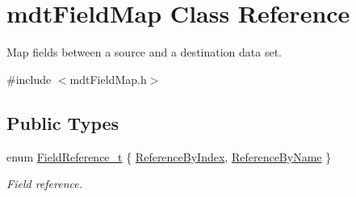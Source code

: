 \hypertarget{classmdt_field_map}{\section{mdt\-Field\-Map Class Reference}
\label{classmdt_field_map}
}


Map fields between a source and a destination data set.  




{\ttfamily \#include $<$mdt\-Field\-Map.\-h$>$}

\subsection*{Public Types}
\begin{DoxyCompactItemize}
\item 
enum \hyperlink{classmdt_field_map_a8a8dd62273d396d926bf3df837407392}{Field\-Reference\-\_\-t} \{ \hyperlink{classmdt_field_map_a8a8dd62273d396d926bf3df837407392a97087465cf8e740359c63ded60db38e6}{Reference\-By\-Index}, 
\hyperlink{classmdt_field_map_a8a8dd62273d396d926bf3df837407392a1e9f34c9b214c691edc9d0ed7f7056a1}{Reference\-By\-Name}
 \}
\begin{DoxyCompactList}\small\item\em Field reference. \end{DoxyCompactList}\end{DoxyCompactItemize}
